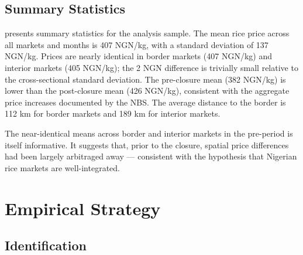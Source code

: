 \documentclass[12pt]{article}
\begin{document}
\subsection{Summary Statistics}

 presents summary statistics for the analysis sample. The mean rice price across all markets and months is 407 NGN/kg, with a standard deviation of 137 NGN/kg. Prices are nearly identical in border markets (407 NGN/kg) and interior markets (405 NGN/kg); the 2 NGN difference is trivially small relative to the cross-sectional standard deviation. The pre-closure mean (382 NGN/kg) is lower than the post-closure mean (426 NGN/kg), consistent with the aggregate price increases documented by the NBS. The average distance to the border is 112 km for border markets and 189 km for interior markets.

The near-identical means across border and interior markets in the pre-period is itself informative. It suggests that, prior to the closure, spatial price differences had been largely arbitraged away --- consistent with the hypothesis that Nigerian rice markets are well-integrated.




\section{Empirical Strategy}
\label{sec:strategy}

\subsection{Identification}
\end{document}
